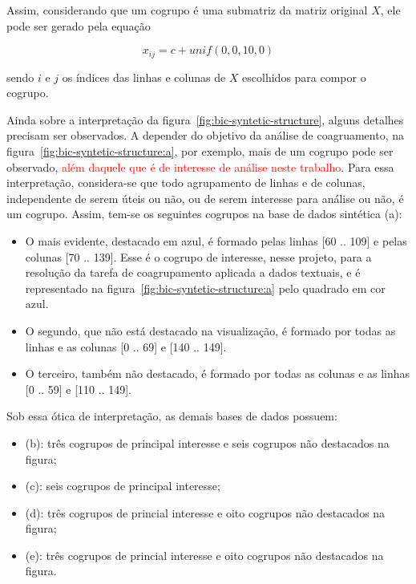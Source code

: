 \documentclass[
    12pt,                %
    oneside,            %
    a4paper,            %
    english,            %
    brazil                %
    ]{abntex2ppgsi}
\begin{document}
Assim, considerando que um cogrupo é uma submatriz da matriz original $X$, ele pode ser gerado pela equação %

\begin{equation}
\label{eq:genbic}
    x_{ij} = c + unif(0,0, 10,0)    \nonumber
\end{equation}

sendo $i$ e $j$ os índices das linhas e colunas de $X$ escolhidos para compor o cogrupo.


Ainda sobre a interpretação da figura~\ref{fig:bic-syntetic-structure}, alguns detalhes precisam ser observados. A depender do objetivo da análise de coagruamento, na figura~\ref{fig:bic-syntetic-structure:a}, por exemplo, mais de um cogrupo pode ser observado, \textcolor{red}{além daquele que é de interesse de análise neste trabalho}. Para essa interpretação, considera-se que todo agrupamento de linhas e de colunas, independente de serem úteis ou não, ou de serem interesse para análise ou não, é um cogrupo. Assim, tem-se os seguintes cogrupos na base de dados sintética (a):


\begin{itemize}
\item O mais evidente, destacado em azul, é formado pelas linhas [60 .. 109] e pelas colunas [70 .. 139]. Esse é o cogrupo de interesse, nesse projeto, para a resolução da tarefa de coagrupamento aplicada a dados textuais, e é representado na figura~\ref{fig:bic-syntetic-structure:a} pelo quadrado em cor azul.
\item O segundo, que não está destacado na visualização, é formado por todas as linhas e as colunas [0 .. 69] e [140 .. 149].
\item O terceiro, também não destacado, é formado por todas as colunas e as linhas [0 .. 59] e [110 .. 149].
\end{itemize}

Sob essa ótica de interpretação, as demais bases de dados possuem:

\begin{itemize}
\item (b): três cogrupos de principal interesse e seis cogrupos não destacados na figura;
\item (c): seis cogrupos de principal interesse;
\item (d): três cogrupos de princial interesse e oito cogrupos não destacados na figura;
\item (e): três cogrupos de princial interesse e oito cogrupos não destacados na figura.
\end{itemize}
\end{document}
